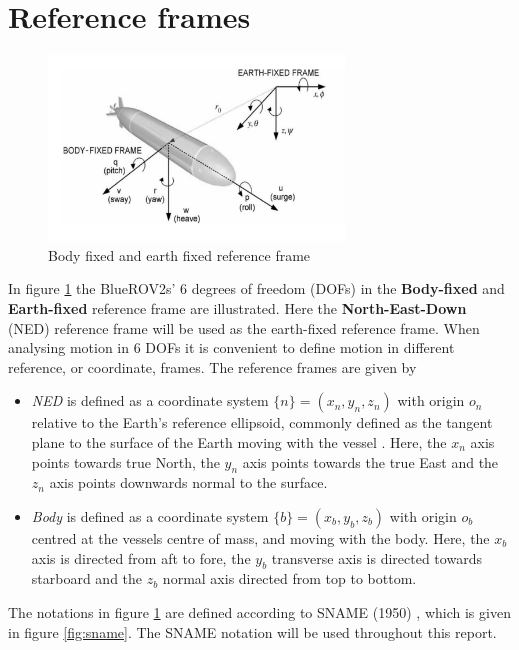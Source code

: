 \section{Reference frames}
\begin{figure}[H]
    \centering
    \includegraphics[width=0.7\textwidth]{images/chap4/reference_frames.png}
    \caption{Body fixed and earth fixed reference frame}
    \label{fig:reference_frame}
\end{figure}
In figure \ref{fig:reference_frame} the BlueROV2s' 6 degrees of freedom (DOFs) in the \textbf{Body-fixed} and \textbf{Earth-fixed} reference frame are illustrated. Here the \textbf{North-East-Down} (NED) reference frame will be used as the earth-fixed reference frame. When analysing motion in 6 DOFs it is convenient to define motion in different reference, or coordinate, frames. The reference frames are given by
\begin{itemize}
    \item \textit{NED} is defined as a coordinate system $\{n\} = (x_{n},y_{n},z_{n})$ with origin $o_{n}$ relative to the Earth's reference ellipsoid, commonly defined as the tangent plane to the surface of the Earth moving with the vessel \cite{Fossen}. Here, the $x_{n}$ axis points towards true North, the $y_{n}$ axis points towards the true East and the $z_{n}$ axis points downwards normal to the surface. 
    \item \textit{Body} is defined as a coordinate system $\{b\} = (x_{b},y_{b},z_{b})$ with origin $o_{b}$ centred at the vessels centre of mass, and moving with the body. Here, the $x_{b}$ axis is directed from aft to fore, the $y_{b}$ transverse axis is directed towards starboard and the $z_{b}$ normal axis directed from top to bottom. 
\end{itemize}
The notations in figure \ref{fig:reference_frame} are defined according to SNAME (1950) \cite{Fossen}, which is given in figure \ref{fig:sname}. The SNAME notation will be used throughout this report. 

